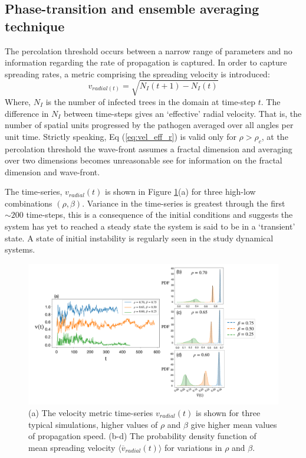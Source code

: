 \subsection{Phase-transition and ensemble averaging technique}

The percolation threshold occurs between a narrow range of parameters and no information regarding the rate of propagation is captured. %
In order to capture spreading rates, a metric comprising the spreading velocity is introduced: %
\begin{equation}
\label{eq:vel_eff_r}
    v_{radial(t)}=\sqrt{N_I(t+1)-N_I(t)}
\end{equation} 
Where, $N_I$ is the number of infected trees in the domain at time-step $t$. %
The difference in $N_I$ between time-steps gives an `effective' radial velocity. %
That is, the number of spatial units progressed by the pathogen averaged over all angles per unit time. %
Strictly speaking, Eq (\ref{eq:vel_eff_r}) is valid only for $\rho > \rho_c$, %
at the percolation threshold the wave-front assumes a fractal dimension and averaging over two dimensions becomes unreasonable\textemdash
see \cite{OROZCOFUENTES201912} for information on the fractal dimension and wave-front. %

The time-series, $v_{radial}(t)$ is shown in Figure \ref{fig:vel_eff_rad_metric}(a) for three high-low combinations $(\rho, \beta)$. %
Variance in the time-series is greatest through the first $\sim 200$ time-steps, %
this is a consequence of the initial conditions and suggests the system has yet to reached a steady state \textemdash %
the system is said to be in a `transient' state. %
A state of initial instability is regularly seen in the study dynamical systems. %

\begin{figure}
    \centering
    \includegraphics[scale=0.26]{chapter3/figures/figure7.pdf}
    \caption{(a) The velocity metric time-series $v_{radial}(t)$ is shown for three typical simulations, higher values of $\rho$ and $\beta$ give higher mean values of propagation speed. (b-d) The probability density function of mean spreading velocity $\big\langle \overline{v}_{radial}(t) \big\rangle$ for variations in $\rho$ and $\beta$.}
    \label{fig:vel_eff_rad_metric}
\end{figure}

